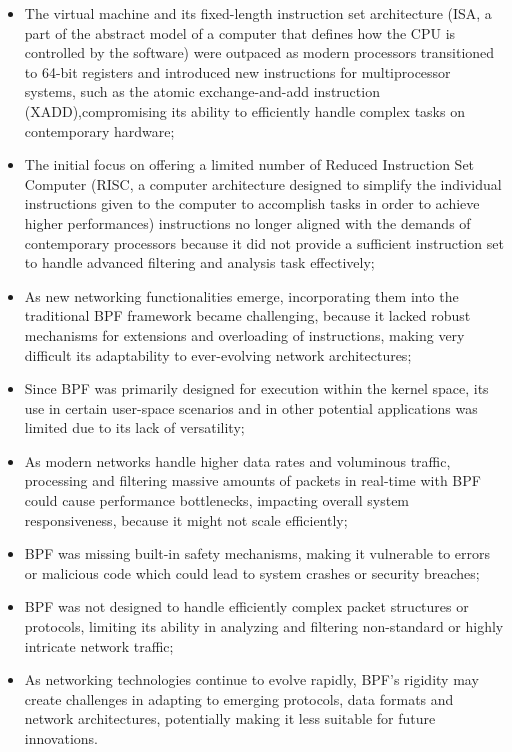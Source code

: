 \begin{itemize}
	\item The virtual machine and its fixed-length instruction set architecture (ISA, 
		a part of the abstract model of a computer that defines how the CPU is controlled by the software) were outpaced as modern processors transitioned to 64-bit registers and introduced new instructions for multiprocessor systems, such as the atomic exchange-and-add instruction (XADD),compromising its ability to efficiently handle complex tasks on contemporary hardware;
	\item The initial focus on offering a limited number of Reduced Instruction Set
		Computer (RISC, a computer architecture designed to simplify the individual instructions given to the computer to accomplish tasks in order to achieve higher performances) instructions no longer aligned with the demands of contemporary processors because it did not provide a sufficient instruction set to handle advanced filtering and analysis task effectively;
	\item As new networking functionalities emerge, incorporating them into the 
		traditional BPF framework became challenging, because it lacked robust mechanisms for extensions and overloading of instructions, making very difficult its adaptability to ever-evolving network architectures;
	\item Since BPF was primarily designed for execution within the kernel space,
		its use in certain user-space scenarios and in other potential applications was limited due to its lack of versatility;
	\item As modern networks handle higher data rates and voluminous traffic,
		processing and filtering massive amounts of packets in real-time with BPF could cause performance bottlenecks, impacting overall system responsiveness, because it might not scale efficiently;
	\item BPF was missing built-in safety mechanisms, making it vulnerable to errors
		or malicious code which could lead to system crashes or security breaches;
	\item BPF was not designed to handle efficiently complex packet structures or
		protocols, limiting its ability in analyzing and filtering non-standard or highly intricate network traffic;
	\item As networking technologies continue to evolve rapidly, BPF's rigidity 
		may create challenges in adapting to emerging protocols, data formats and network architectures, potentially making it less suitable for future innovations.
\end{itemize} 

